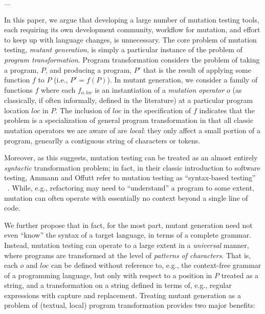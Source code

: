 \documentclass[sigconf,review, anonymous]{acmart}
\begin{document}
...


In this paper, we argue that developing a large number of mutation
testing tools, each requiring its own development community, workflow
for mutation, and effort to keep up with language changes, is
unnecessary.  The core problem of mutation testing,
\emph{mutant generation}, is simply a particular instance of the
problem of \emph{program transformation}.  Program transformation
considers the problem of taking a program, $P$, and producing a
program, $P'$ that is the result of applying some function $f$ to $P$
(i.e., $P' = f(P)$).  In mutant generation, we
consider a family of functions $f$ where each $f_{o,loc}$ is an
instantiation of a \emph{mutation operator} $o$  (as classically, if
often informally, defined in the literature) at a particular program
location $loc$ in $P$.  The inclusion of $loc$ in the specification of
$f$ indicates that the problem is a specialization of general
program transformation in that all classic mutation operators we are
aware of are \emph{local}: they only affect a small portion of a
program, genearlly a contiguous string of characters or tokens.

Moreover, as this suggests,
mutation testing can be treated as an almost entirely \emph{syntactic}
transformation problem; in fact, in their classic introduction to
software testing, Ammann and Offutt refer to mutation testing as
``syntax-based testing'' ~\cite{ammann2016introduction}.  While, e.g., refactoring may need to
``understand'' a program to some extent, mutation can often operate
with essentially no context beyond a single line of code.

We further propose that in fact, for the most part, mutant
generation need not even ``know'' the syntax of a target language, in
terms of a complete grammar.  Instead, mutation testing can operate to
a large extent in a \emph{universal} manner, where programs are
transformed at the level of \emph{patterns of characters}.  That is,
each $o$ and $loc$ can be defined without reference to, e.g., the
context-free grammar of a programming language, but only with respect
to a position in $P$ treated as a string, and a transformation on a
string defined in terms of, e.g., regular expressions with capture and
replacement.  Treating mutant generation as a problem of (textual, local)
program transformation provides two major benefits:
\end{document}
